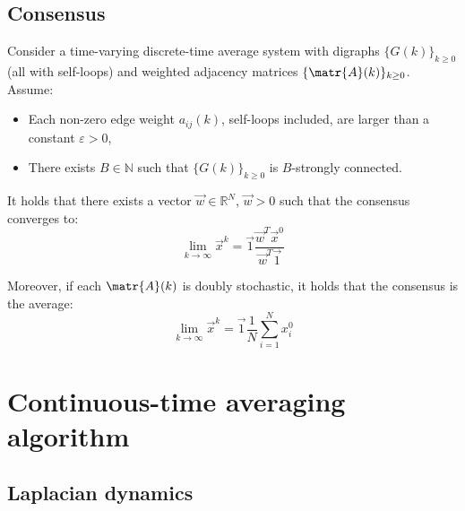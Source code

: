 \subsection{Consensus}

\begin{theorem} 
    Consider a time-varying discrete-time average system with digraphs $\{G(k)\}_{k \geq 0}$ (all with self-loops) and weighted adjacency matrices $\{\matr{A}(k)\}_{k \geq 0}$. Assume:
    \begin{itemize}
        \item Each non-zero edge weight $a_{ij}(k)$, self-loops included, are larger than a constant $\varepsilon > 0$,
        \item There exists $B \in \mathbb{N}$ such that $\{G(k)\}_{k \geq 0}$ is $B$-strongly connected.
    \end{itemize}
    
    It holds that there exists a vector $\vec{w} \in \mathbb{R}^N$, $\vec{w} > 0$ such that the consensus converges to:
        \[ 
            \lim_{k \rightarrow \infty} \vec{x}^k 
            = \vec{1}\frac{\vec{w}^T \vec{x}^0}{\vec{w}^T\vec{1}} 
        \]

    Moreover, if each $\matr{A}(k)$ is doubly stochastic, it holds that the consensus is the average:
    \[ 
        \lim_{k \rightarrow \infty} \vec{x}^k = \vec{1} \frac{1}{N} \sum_{i=1}^N x_i^0
    \]
\end{theorem}



\section{Continuous-time averaging algorithm}

\subsection{Laplacian dynamics}

